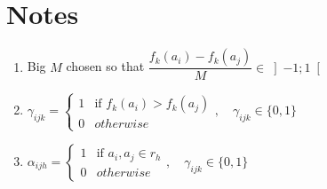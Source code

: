 \documentclass[a4paper]{article}
\begin{document}
    \section{Notes}
    \begin{enumerate}
        \item \label{note:bigm} Big $M$ chosen so that $\dfrac{f_k(a_i)-f_k(a_j)}{M} \in \left]-1;1\right[$
        \item \label{note:betaijk} $\gamma_{ijk} = \begin{cases}
            1 & \text{if } f_k(a_i) > f_k(a_j) \\
            0 & otherwise
        \end{cases}, \quad \gamma_{ijk} \in \{0, 1\}$
        \item $\alpha_{ijh} = \begin{cases}
            1 & \text{if } a_i, a_j \in r_h \\
            0 & otherwise
        \end{cases}, \quad \gamma_{ijk} \in \{0, 1\}$
    \end{enumerate}
\end{document}
